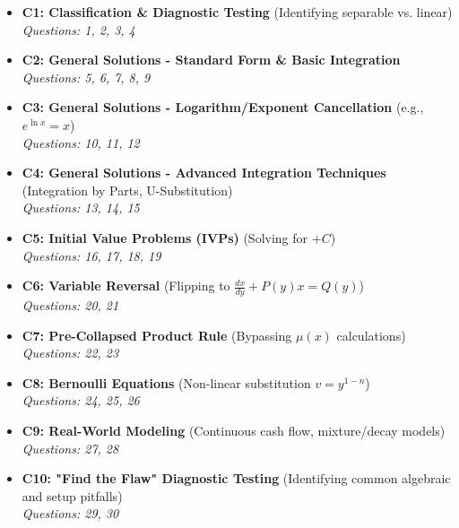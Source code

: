 \documentclass[11pt]{article}
\begin{document}
\begin{itemize}
    \item \textbf{C1: Classification \& Diagnostic Testing} (Identifying separable vs. linear) 
    \\ \textit{Questions: 1, 2, 3, 4}
    
    \item \textbf{C2: General Solutions - Standard Form \& Basic Integration} 
    \\ \textit{Questions: 5, 6, 7, 8, 9}
    
    \item \textbf{C3: General Solutions - Logarithm/Exponent Cancellation} (e.g., $e^{\ln x} = x$) 
    \\ \textit{Questions: 10, 11, 12}
    
    \item \textbf{C4: General Solutions - Advanced Integration Techniques} (Integration by Parts, U-Substitution) 
    \\ \textit{Questions: 13, 14, 15}
    
    \item \textbf{C5: Initial Value Problems (IVPs)} (Solving for $+C$) 
    \\ \textit{Questions: 16, 17, 18, 19}
    
    \item \textbf{C6: Variable Reversal} (Flipping to $\frac{dx}{dy} + P(y)x = Q(y)$) 
    \\ \textit{Questions: 20, 21}
    
    \item \textbf{C7: Pre-Collapsed Product Rule} (Bypassing $\mu(x)$ calculations) 
    \\ \textit{Questions: 22, 23}
    
    \item \textbf{C8: Bernoulli Equations} (Non-linear substitution $v = y^{1-n}$) 
    \\ \textit{Questions: 24, 25, 26}
    
    \item \textbf{C9: Real-World Modeling} (Continuous cash flow, mixture/decay models) 
    \\ \textit{Questions: 27, 28}
    
    \item \textbf{C10: "Find the Flaw" Diagnostic Testing} (Identifying common algebraic and setup pitfalls) 
    \\ \textit{Questions: 29, 30}
\end{itemize}
\end{document}
